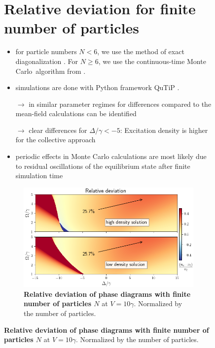 \documentclass[a0,plainsections]{sciposter}
\begin{document}
\begin{multicols}{2}
	\addtocounter{figure}{-2}
	\begin{figure}[h]
		\begin{minipage}{0.55\textwidth}
			\section*{Relative deviation for finite number of particles}
			\begin{itemize}
				\item for particle numbers $N<6$, we use the method of exact diagonalization
				      \cite{Schaller2015}. For $N\geq6$, we use the \glqq continuous-time Monte Carlo\grqq\ algorithm from \cite{Plenio1998}.
				\item simulations are done with Python framework QuTiP \cite{qutip1,qutip2}.
				\item[\textcolor{rot}{$\rightarrow$}] in  similar parameter regimes for differences compared to the mean-field calculations can be identified
				\item[\textcolor{rot}{$\rightarrow$}] clear differences for $\Delta/ \gamma<-5$: Excitation density is higher for the collective approach
				\item periodic effects in Monte Carlo calculations are most likely due to residual oscillations of the equilibrium state after finite simulation time
			\end{itemize}
		\end{minipage}
		\hfill
		\begin{minipage}{0.4\textwidth}
			\begin{figure}
				\captionsetup{type=figure}
				\vspace*{-50pt} %
				\includegraphics[width=\linewidth]{./images/DemoPlot.png}
				\vspace*{-60pt}
				\caption{\textbf{Relative deviation of phase diagrams with finite number of particles $N$} at $V=10\gamma$. Normalized by the number of particles.}
				\label{fig:numericResults}
			\end{figure}
		\end{minipage}
	\end{figure}


\end{multicols}
\end{document}
